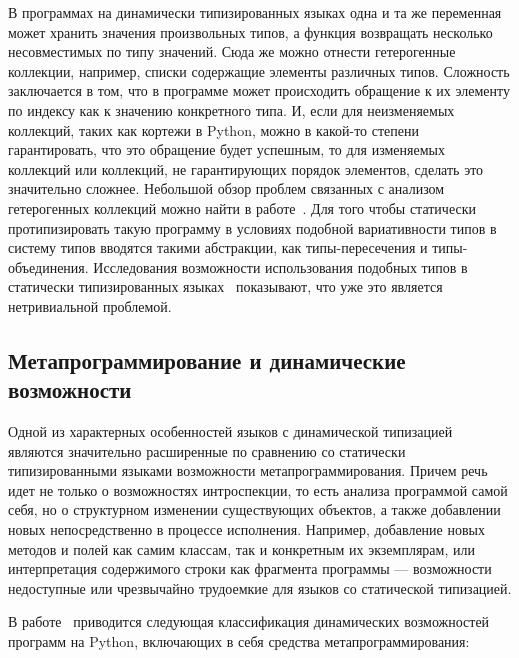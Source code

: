 В программах на динамически типизированных языках одна и та же переменная может
хранить значения произвольных типов, а функция возвращать несколько
несовместимых по типу значений. Сюда же можно отнести гетерогенные коллекции,
например, списки содержащие элементы различных типов. Сложность заключается в
том, что в программе может происходить обращение к их элементу по индексу как к
значению конкретного типа. И, если для неизменяемых коллекций, таких как кортежи
в Python, можно в какой-то степени гарантировать, что это обращение будет
успешным, то для изменяемых коллекций или коллекций, не гарантирующих порядок
элементов, сделать это значительно сложнее. Небольшой обзор проблем связанных с
анализом гетерогенных коллекций можно найти в работе~\cite[]{Salib2004}. 
Для того чтобы статически протипизировать такую программу в условиях подобной
вариативности типов в систему типов вводятся такими абстракции, как
типы-пересечения и типы-объединения. Исследования возможности использования
подобных типов в статически типизированных
языках~\cite[]{Igarashi2006,Ortin2011:union}  показывают, что уже это является
нетривиальной проблемой.

\subsection{Метапрограммирование и динамические возможности}

Одной из характерных особенностей языков с динамической типизацией являются
значительно расширенные по сравнению со статически типизированными языками
возможности метапрограммирования. Причем речь идет не только о возможностях
интроспекции, то есть анализа программой самой себя, но о структурном изменении
существующих объектов, а также добавлении новых непосредственно в процессе
исполнения. Например, добавление новых методов и полей как самим классам, так и
конкретным их экземплярам, или интерпретация содержимого строки как фрагмента
программы --- возможности недоступные или чрезвычайно трудоемкие для языков со
статической типизацией.

В работе~\cite[]{Holkner2009} приводится следующая классификация динамических возможностей
программ на Python, включающих в себя средства метапрограммирования: 

